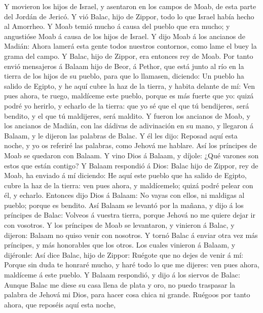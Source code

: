  Y movieron los hijos de Israel, y asentaron en los campos
de Moab, de esta parte del Jordán de Jericó.  Y vió Balac,
hijo de Zippor, todo lo que Israel había hecho al Amorrheo. 
Y Moab temió mucho á causa del pueblo que era mucho; y angustióse Moab á
causa de los hijos de Israel.  Y dijo Moab á los ancianos de
Madián: Ahora lamerá esta gente todos nuestros contornos, como lame el
buey la grama del campo. Y Balac, hijo de Zippor, era entonces rey de
Moab.  Por tanto envió mensajeros á Balaam hijo de Beor, á
Pethor, que está junto al río en la tierra de los hijos de su pueblo,
para que lo llamasen, diciendo: Un pueblo ha salido de Egipto, y he aquí
cubre la haz de la tierra, y habita delante de mí:  Ven pues
ahora, te ruego, maldíceme este pueblo, porque es más fuerte que yo:
quizá podré yo herirlo, y echarlo de la tierra: que yo sé que el que tú
bendijeres, será bendito, y el que tú maldijeres, será maldito.
 Y fueron los ancianos de Moab, y los ancianos de Madián,
con las dádivas de adivinación en su mano, y llegaron á Balaam, y le
dijeron las palabras de Balac.  Y él les dijo: Reposad aquí
esta noche, y yo os referiré las palabras, como Jehová me hablare. Así
los príncipes de Moab se quedaron con Balaam.  Y vino Dios á
Balaam, y díjole: ¿Qué varones son estos que están contigo?
 Y Balaam respondió á Dios: Balac hijo de Zippor, rey de
Moab, ha enviado á mí diciendo:  He aquí este pueblo que ha
salido de Egipto, cubre la haz de la tierra: ven pues ahora, y
maldícemelo; quizá podré pelear con él, y echarlo. 
Entonces dijo Dios á Balaam: No vayas con ellos, ni maldigas al pueblo;
porque es bendito.  Así Balaam se levantó por la mañana, y
dijo á los príncipes de Balac: Volveos á vuestra tierra, porque Jehová
no me quiere dejar ir con vosotros.  Y los príncipes de
Moab se levantaron, y vinieron á Balac, y dijeron: Balaam no quiso venir
con nosotros.  Y tornó Balac á enviar otra vez más
príncipes, y más honorables que los otros.  Los cuales
vinieron á Balaam, y dijéronle: Así dice Balac, hijo de Zippor: Ruégote
que no dejes de venir á mí:  Porque sin duda te honraré
mucho, y haré todo lo que me dijeres: ven pues ahora, maldíceme á este
pueblo.  Y Balaam respondió, y dijo á los siervos de Balac:
Aunque Balac me diese su casa llena de plata y oro, no puedo traspasar
la palabra de Jehová mi Dios, para hacer cosa chica ni grande.
 Ruégoos por tanto ahora, que reposéis aquí esta noche,
